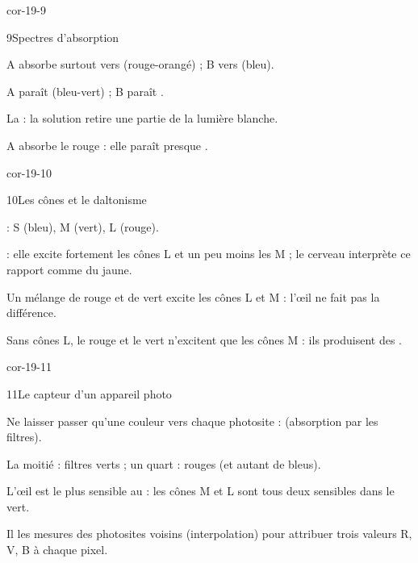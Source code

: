 \begin{blocLivre}{cor-19-9}
\begin{corrige}{9}{Spectres d'absorption}
\begin{questions}
\item A absorbe surtout vers  (rouge-orangé) ; B vers  (bleu).
\item A paraît  (bleu-vert) ; B paraît .
\item La  : la solution retire une partie de la lumière blanche.
\item A absorbe le rouge : elle paraît presque .
\end{questions}
\end{corrige}
\end{blocLivre}
\begin{blocLivre}{cor-19-10}
\begin{corrige}{10}{Les cônes et le daltonisme}
\begin{questions}
\item {} : S (bleu), M (vert), L (rouge).
\item {} : elle excite fortement les cônes L et un peu moins les M ; le cerveau interprète ce rapport comme du jaune.
\item Un mélange de rouge et de vert excite les cônes L et M  : l'œil ne fait pas la différence.
\item Sans cônes L, le rouge et le vert n'excitent que les cônes M : ils produisent des .
\end{questions}
\end{corrige}
\end{blocLivre}
\begin{blocLivre}{cor-19-11}
\begin{corrige}{11}{Le capteur d'un appareil photo}
\begin{questions}
\item Ne laisser passer qu'une couleur vers chaque photosite :  (absorption par les filtres).
\item La moitié :  filtres verts ; un quart :  rouges (et autant de bleus).
\item L'œil est le plus sensible au  : les cônes M et L sont tous deux sensibles dans le vert.
\item Il  les mesures des photosites voisins (interpolation) pour attribuer trois valeurs R, V, B à chaque pixel.
\end{questions}
\end{corrige}
\end{blocLivre}
